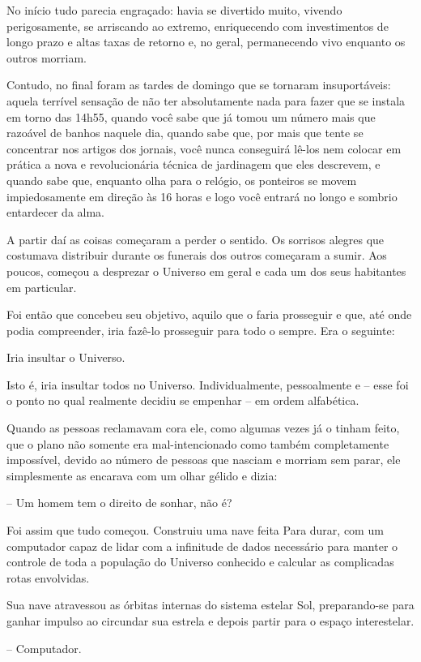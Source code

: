 \documentclass[eps,11pt]{book}
\begin{document}
No início tudo parecia engraçado: havia se divertido muito, vivendo perigosamente, se arriscando ao extremo, enriquecendo com investimentos de longo prazo e altas taxas de retorno e, no geral, permanecendo vivo enquanto os outros morriam.

Contudo, no final foram as tardes de domingo que se tornaram insuportáveis: aquela terrível sensação de não ter absolutamente nada para fazer que se instala em torno das 14h55, quando você sabe que já tomou um número mais que razoável de banhos naquele dia, quando sabe que, por mais que tente se concentrar nos artigos dos jornais, você nunca conseguirá lê-los nem colocar em prática a nova e revolucionária técnica de jardinagem que eles descrevem, e quando sabe que, enquanto olha para o relógio, os ponteiros se movem impiedosamente em direção às 16 horas e logo você entrará no longo e sombrio entardecer da alma.

A partir daí as coisas começaram a perder o sentido. Os sorrisos alegres que costumava distribuir durante os funerais dos outros começaram a sumir. Aos poucos, começou a desprezar o Universo em geral e cada um dos seus habitantes em particular.

Foi então que concebeu seu objetivo, aquilo que o faria prosseguir e que, até onde podia compreender, iria fazê-lo prosseguir para todo o sempre. Era o seguinte:

Iria insultar o Universo.

Isto é, iria insultar todos no Universo. Individualmente, pessoalmente e -- esse foi o ponto no qual realmente decidiu se empenhar -- em ordem alfabética.

Quando as pessoas reclamavam cora ele, como algumas vezes já o tinham feito, que o plano não somente era mal-intencionado como também completamente impossível, devido ao número de pessoas que nasciam e morriam sem parar, ele simplesmente as encarava com um olhar gélido e dizia:

-- Um homem tem o direito de sonhar, não é?

Foi assim que tudo começou. Construiu uma nave feita Para durar, com um computador capaz de lidar com a infinitude de dados necessário para manter o controle de toda a população do Universo conhecido e calcular as complicadas rotas envolvidas.

Sua nave atravessou as órbitas internas do sistema estelar Sol, preparando-se para ganhar impulso ao circundar sua estrela e depois partir para o espaço interestelar.

-- Computador.
\end{document}
